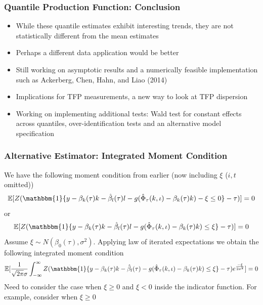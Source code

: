 \documentclass{beamer}
\begin{document}
\begin{frame}
\frametitle{Quantile Production Function: Conclusion}
\begin{itemize}
	\item While these quantile estimates exhibit interesting trends, they are not statistically different from the mean estimates
	\item Perhaps a different data application would be better
	\item Still working on asymptotic results and a numerically feasible implementation such as Ackerberg, Chen, Hahn, and Liao (2014)
	\item Implications for TFP measurements, a new way to look at TFP dispersion
	\item Working on implementing additional tests: Wald test for constant effects across quantiles, over-identification tests and an alternative model specification
\end{itemize}
\end{frame}


\begin{frame}
\frametitle{Alternative Estimator: Integrated Moment Condition}
We have the following moment condition from earlier (now including $\xi$ ($i,t$ omitted))
\begin{equation}
	\mathbb{E}[Z(\mathbbm{1}\{y-\beta_{k}(\tau)k-\hat{\beta}_{l}(\tau)l-g(\hat{\Phi}_{\tau}(k, \iota)-\beta_{k}(\tau)k)-\xi\leq 0\}-\tau)]=0
	\end{equation}
	or 
\begin{equation}
	\mathbb{E}[Z(\mathbbm{1}\{y-\beta_{k}(\tau)k-\hat{\beta}_{l}(\tau)l-g(\hat{\Phi}_{\tau}(k, \iota)-\beta_{k}(\tau)k)\leq \xi\}-\tau)]=0
\end{equation}
Assume $\xi \sim N(\beta_{0}(\tau),\sigma^{2})$. Applying law of iterated expectations we obtain the following integrated moment condition
\small
\begin{equation}
	\mathbb{E}[\frac{1}{\sqrt{2\pi}\sigma}\int_{-\infty}^{\infty}Z(\mathbbm{1}\{y-\beta_{k}(\tau)k-\hat{\beta}_{l}(\tau)-g(\hat{\Phi}_{\tau}(k, \iota)-\beta_{k}(\tau)k)\leq \xi\}-\tau)e^{\frac{-\xi}{2\sigma^{2}}}]=0
\end{equation}
Need to consider the case when $\xi\geq0$ and $\xi<0$ inside the indicator function. For example, consider when $\xi\geq0$
\end{frame}

\end{document}
